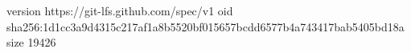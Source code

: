 version https://git-lfs.github.com/spec/v1
oid sha256:1d1cc3a9d4315c217af1a8b5520bf015657bcdd6577b4a743417bab5405bd18a
size 19426

